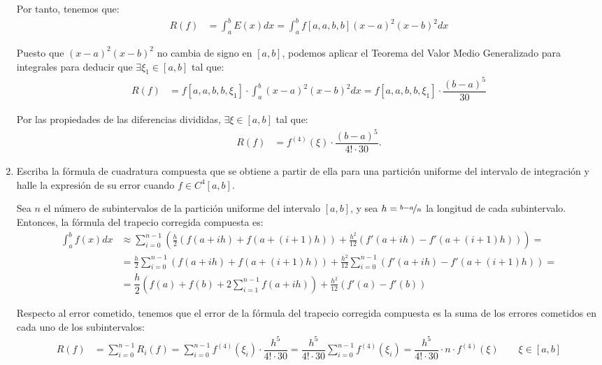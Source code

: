 \begin{ejercicio}
\begin{enumerate}
        Por tanto, tenemos que:
        \begin{align*}
            R(f) &= \int_{a}^{b} E(x) dx = \int_{a}^{b} f[a,a,b,b](x - a)^2(x - b)^2 dx
        \end{align*}

        Puesto que $(x - a)^2(x - b)^2$ no cambia de signo en $[a, b]$, podemos aplicar el Teorema del Valor Medio Generalizado para integrales para deducir que $\exists \xi_1 \in [a, b]$ tal que:
        \begin{align*}
            R(f) &= f[a,a,b,b,\xi_1]\cdot \int_{a}^{b} (x - a)^2(x - b)^2 dx
            = f[a,a,b,b,\xi_1]\cdot \dfrac{(b - a)^5}{30}
        \end{align*}

        Por las propiedades de las diferencias divididas, $\exists \xi \in [a, b]$ tal que:
        \begin{align*}
            R(f) &= f^{(4)}(\xi)\cdot \dfrac{(b - a)^5}{4!\cdot 30}.
        \end{align*}
        \item Escriba la fórmula de cuadratura compuesta que se obtiene a partir de ella para una partición uniforme del intervalo de integración y halle la expresión de su error cuando $f \in C^4[a, b]$.
        
        Sea $n$ el número de subintervalos de la partición uniforme del intervalo $[a, b]$, y sea $h = \nicefrac{b-a}{n}$ la longitud de cada subintervalo. 
        Entonces, la fórmula del trapecio corregida compuesta es:
        \begin{align*}
            \int_{a}^{b} f(x) dx &\approx \sum_{i=0}^{n-1} \left( \frac{h}{2}\left( f(a + ih) + f(a + (i+1)h) \right) + \frac{h^2}{12}\left( f'(a + ih) - f'(a + (i+1)h) \right) \right)
            =\\&= \frac{h}{2}\sum_{i=0}^{n-1} (f(a + ih) + f(a + (i+1)h)) + \frac{h^2}{12}\sum_{i=0}^{n-1} (f'(a + ih) - f'(a + (i+1)h))
            =\\&= \dfrac{h}{2}\left( f(a) + f(b) + 2\sum_{i=1}^{n-1} f(a + ih) \right) + \frac{h^2}{12}\left( f'(a) - f'(b)\right)
        \end{align*}

        Respecto al error cometido, tenemos que el error de la fórmula del trapecio corregida compuesta es la suma de los errores cometidos en cada uno de los subintervalos:
        \begin{align*}
            R(f) &= \sum_{i=0}^{n-1} R_i(f) = \sum_{i=0}^{n-1} f^{(4)}(\xi_i)\cdot \dfrac{h^5}{4!\cdot 30} = \dfrac{h^5}{4!\cdot 30} \sum_{i=0}^{n-1} f^{(4)}(\xi_i)
            = \dfrac{h^5}{4!\cdot 30}\cdot n\cdot f^{(4)}(\xi)\qquad \xi \in [a, b]
        \end{align*}


\end{enumerate}
\end{ejercicio}
